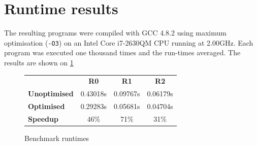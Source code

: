 \section{Runtime results}
\label{sec:runtime-results}

The resulting programs were compiled with GCC 4.8.2 using maximum
optimisation (\texttt{-O3}) on an Intel Core i7-2630QM CPU running at
2.00GHz.  Each program was executed one thousand times and the
run-times averaged.  The results are shown on \cref{fig:speedups}

\begin{figure}
\begin{center}
\begin{tabular}{l|c|c|c}
& \textbf{R0} & \textbf{R1} & \textbf{R2} \\
\textbf{Unoptimised} & 0.43018s & 0.09767s & 0.06179s \\
\textbf{Optimised}   & 0.29283s & 0.05681s & 0.04704s \\\hline
\textbf{Speedup}     & 46\%     & 71\%     & 31\%
\end{tabular}
\end{center}

\caption{Benchmark runtimes}

\label{fig:speedups}
\end{figure}


